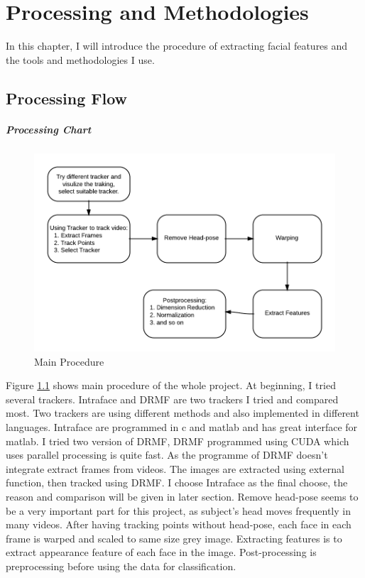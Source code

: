 \chapter{Processing and Methodologies}
In this chapter, I will introduce the procedure of extracting facial features and the tools and methodologies I use.
\section{Processing Flow}
\paragraph{Processing Chart}
\begin{figure}[ht]
\centering
\includegraphics[width=\textwidth]{imgs/ProcedureChart.png}
\caption{Main Procedure}
\label{fig:proc}
\end{figure}
Figure \ref{fig:proc} shows main procedure of the whole project. At beginning, I tried several trackers. Intraface and DRMF are two trackers I tried and compared most. Two trackers are using different methods and also implemented in different languages. Intraface are programmed in c and matlab and has great interface for matlab. I tried two version of DRMF, DRMF programmed using CUDA which uses parallel processing is quite fast. As the programme of DRMF doesn't integrate extract frames from videos. The images are extracted using external function, then tracked using DRMF. I choose Intraface as the final choose, the reason and comparison will be given in later section. Remove head-pose seems to be a very important part for this project, as subject's head moves frequently in many videos. After having tracking points without head-pose, each face in each frame is warped and scaled to same size grey image. Extracting features is to extract appearance feature of each face in the image. Post-processing is preprocessing before using the data for classification.
